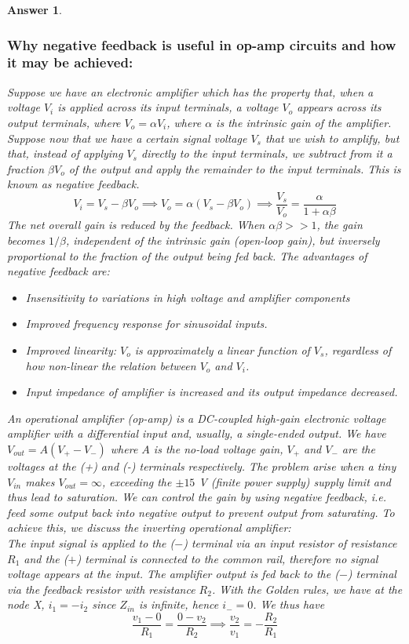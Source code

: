 \documentclass[a4paper]{article}
\newtheorem{ans}{Answer}[subsection]
\theoremstyle{new}
\begin{document}
\begin{ans}\leavevmode
\subsubsection*{Why negative feedback is useful in op-amp circuits and how it may be achieved:}
Suppose we have an electronic amplifier which has the property that, when a voltage $V_i$ is applied across its input terminals, a voltage $V_o$ appears across its output terminals, where $V_o=\alpha V_i$, where $\alpha$ is the intrinsic gain of the amplifier.\\[5pt]
Suppose now that we have a certain signal voltage $V_s$ that we wish to amplify, but that, instead of applying $V_s$ directly to the input terminals, we subtract from it a fraction $\beta V_o$ of the output and apply the remainder to the input terminals. This is known as negative feedback. 
$$V_i=V_s-\beta V_o\implies V_o=\alpha(V_s-\beta V_o)\implies\frac{V_s}{V_o}=\frac{\alpha}{1+\alpha\beta}$$
The net overall gain is reduced by the feedback. When $\alpha\beta>>1$, the gain becomes $1/\beta$, independent of the intrinsic gain (open-loop gain), but inversely proportional to the fraction of the output being fed back. The advantages of negative feedback are:
\begin{itemize}
    \item Insensitivity to variations in high voltage and amplifier components
    \item Improved frequency response for sinusoidal inputs. 
    \item Improved linearity: $V_o$ is approximately a linear function of $V_s$, regardless of how non-linear the relation between $V_o$ and $V_i$.
    \item Input impedance of amplifier is increased and its output impedance decreased.
\end{itemize}
An operational amplifier (op-amp) is a DC-coupled high-gain electronic voltage amplifier with a differential input and, usually, a single-ended output. We have $V_{out}=A(V_+-V_-)$ where $A$ is the no-load voltage gain, $V_+$ and $V_-$ are the voltages at the (+) and (-) terminals respectively. The problem arise when a tiny $V_{in}$ makes $V_{out}=\infty$, exceeding the $\pm15$ V (finite power supply) supply limit and thus lead to saturation. We can control the gain by using negative feedback, i.e. feed some output back into negative output to prevent output from saturating. To achieve this, we discuss the inverting operational amplifier:\\[5pt]
The input signal is applied to the ($-$) terminal via an input resistor of resistance $R_1$ and the ($+$) terminal is connected to the common rail, therefore no signal voltage appears at the input. The amplifier output is fed back to the ($-$) terminal via the feedback resistor with resistance $R_2$. With the Golden rules, we have at the node X, $i_1=-i_2$ since $Z_{in}$ is infinite, hence $i_-=0$. We thus have $$\frac{v_1-0}{R_1}=\frac{0-v_2}{R_2}\implies\frac{v_2}{v_1}=-\frac{R_2}{R_1}$$
\newpage

\end{ans}
\end{document}
